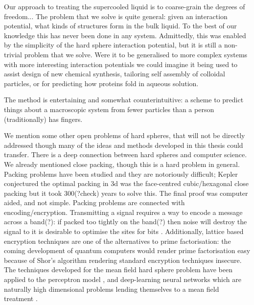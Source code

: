 \documentclass[11pt,twoside]{report}
\begin{document}
Our approach to treating the supercooled liquid is to coarse-grain the degrees of freedom...
The problem that we solve is quite general: given an interaction potential, what kinds of structures form in the bulk liquid.
To the best of our knowledge this has never been done in any system.
Admittedly, this was enabled by the simplicity of the hard sphere interaction potential, but it is still a non-trivial problem that we solve.
Were it to be generalised to more complex systems with more interesting interaction potentials we could imagine it being used to assist design of new chemical synthesis, tailoring self assembly of colloidal particles, or for predicting how proteins fold in aqueous solution.

The method is entertaining and somewhat counterintuitive: a scheme to predict things about a macroscopic system from fewer particles than a person (traditionally) has fingers.

We mention some other open problems of hard spheres, that will not be directly addressed though many of the ideas and methods developed in this thesis could transfer.
There is a deep connection between hard spheres and computer science.
We already mentioned close packing, though this is a hard problem in general.
Packing problems have been studied \cite{Cohn2016,Conway1999} and they are notoriously difficult; Kepler conjectured the optimal packing in 3d was the face-centred cubic/hexagonal close packing but it took 300(?check) years to solve this.
The final proof was computer aided, and not simple.
Packing problems are connected with encoding/encryption.
Transmitting a signal requires a way to encode a message across a band(?): if packed too tightly on the band(?) then noise will destroy the signal to it is desirable to optimise the sites for bits \cite{Cohn,?,?}.
Additionally, lattice based encryption techniques are one of the alternatives to prime factorisation: the coming development of quantum computers \cite{?,?} would render prime factorisation easy because of Shor's algorithm \cite{Shor?} rendering standard encryption techniques insecure.
The techniques developed for the mean field hard sphere problem have been applied to the perceptron model \cite{?}, and deep-learning neural networks which are naturally high dimensional problems lending themselves to a mean field treatment \cite{?}.
\end{document}
